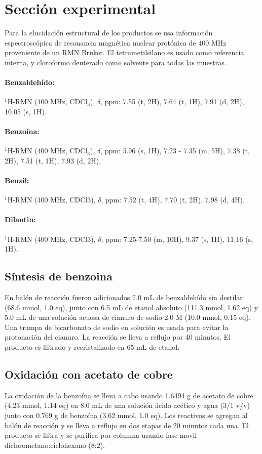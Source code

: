 \documentclass[fleqn,10pt]{SelfArx}
\begin{document}
\section{Secci\'on experimental}
Para la elucidaci\'on estructural de los productos se usa informaci\'on espectrosc\'opica de resonancia magn\'etica nuclear prot\'onica de 400 MHz proveniente de un RMN Bruker. El tetrametilsilano es usado como referencia interna, y cloroformo deuterado como solvente para todas las muestras.
\paragraph{Benzaldehído:} $^1$H-RMN (400 MHz, CDCl$_3$), $\delta$, ppm: 7.55 (t, 2H), 7.64 (t, 1H), 7.91 (d, 2H), 10.05 (s, 1H).

\paragraph{Benzo\'ina:} $^1$H-RMN (400 MHz, CDCl$_3$), $\delta$, ppm: 5.96 (s, 1H), 7.23 - 7.35 (m, 5H), 7.38 (t, 2H), 7.51 (t, 1H), 7.93 (d, 2H).

\paragraph{Benzil:} $^1$H-RMN (400 MHz, CDCl3), $\delta$, ppm: 7.52 (t, 4H), 7.70 (t, 2H), 7.98 (d, 4H). 

\paragraph{Dilantin:} $^1$H-RMN (400 MHz, CDCl3), $\delta$, ppm: 7.25-7.50 (m, 10H), 9.37 (s, 1H), 11.16 (s, 1H). 

\subsection{S\'intesis de benzoina}
En bal\'on de reacci\'on fueron adicionados 7.0 mL de benzaldeh\'ido sin destilar (68.6 mmol, 1.0 eq), junto con 6.5 mL de etanol absoluto (111.3 mmol, 1.62 eq) y 5.0 mL de una soluci\'on acuosa de cianuro de sodio 2.0 M (10.0 mmol, 0.15 eq). Una trampa de bicarbonato de sodio en soluci\'on es usada para evitar la protonaci\'on del cianuro. La reacci\'on se lleva a reflujo por 40 minutos. El producto es filtrado y recristalizado en 65 mL de etanol.

\subsection{Oxidaci\'on con acetato de cobre}
La oxidaci\'on de la benzo\'ina se lleva a cabo usando 1.6494 g de acetato de cobre (4.23 mmol, 1.14 eq) en 8.0 mL de una soluci\'on \'acido ac\'etico y agua (3/1 v/v) junto con 0.769 g de benzo\'ina (3.62 mmol, 1.0 eq). Los reactivos se agregan al bal\'on de reacci\'on y se lleva a reflujo en dos etapas de 20 minutos cada una. El producto se filtra y se purifica por columna usando fase movil diclorometano:ciclohexano (8:2).
\end{document}
